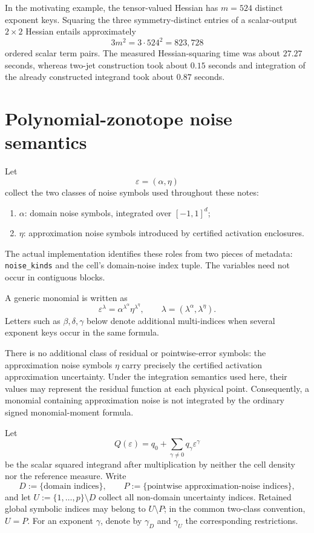 \documentclass[11pt]{article}
\newcommand{\eps}{\varepsilon}
\begin{document}
In the motivating example, the tensor-valued Hessian has \(m=524\) distinct
exponent keys.  Squaring the three symmetry-distinct entries of a scalar-output
\(2\times2\) Hessian entails approximately
\[
    3m^2=3\cdot524^2=823{,}728
\]
ordered scalar term pairs.  The measured Hessian-squaring time was about
\(27.27\) seconds, whereas two-jet construction took about \(0.15\) seconds
and integration of the already constructed integrand took about \(0.87\)
seconds.

\section{Polynomial-zonotope noise semantics}
\label{sec:noise-semantics}

Let
\[
    \eps=(\alpha,\eta)
\]
collect the two classes of noise symbols used throughout these notes:
\begin{enumerate}[label=\arabic*.]
    \item \(\alpha\): domain noise symbols, integrated over \([-1,1]^d\);
    \item \(\eta\): approximation noise symbols introduced by certified
    activation enclosures.
\end{enumerate}
The actual implementation identifies these roles from two pieces of metadata:
\texttt{noise\_kinds} and the cell's domain-noise index tuple.  The variables
need not occur in contiguous blocks.

A generic monomial is written as
\[
    \eps^\lambda
    =\alpha^{\lambda^\alpha}\eta^{\lambda^\eta},
    \qquad
    \lambda=(\lambda^\alpha,\lambda^\eta).
\]
Letters such as \(\beta,\delta,\gamma\) below denote additional
multi-indices when several exponent keys occur in the same formula.

There is no additional class of residual or pointwise-error symbols: the
approximation noise symbols \(\eta\) carry precisely the certified activation
approximation uncertainty.  Under the integration semantics used here, their
values may represent the residual function at each physical point.
Consequently, a monomial containing approximation noise is not integrated by
the ordinary signed monomial-moment formula.

Let
\[
    Q(\eps)=q_0+\sum_{\gamma\neq0}q_\gamma\eps^\gamma
\]
be the scalar squared integrand after multiplication by neither the cell
density nor the reference measure.  Write
\[
    D:=\{\text{domain indices}\},
    \qquad
    P:=\{\text{pointwise approximation-noise indices}\},
\]
and let \(U:=\{1,\ldots,p\}\setminus D\) collect all non-domain uncertainty
indices.  Retained global symbolic indices may belong to \(U\setminus P\); in
the common two-class convention, \(U=P\).  For an exponent \(\gamma\), denote
by \(\gamma_D\) and \(\gamma_U\) the corresponding restrictions.
\end{document}
